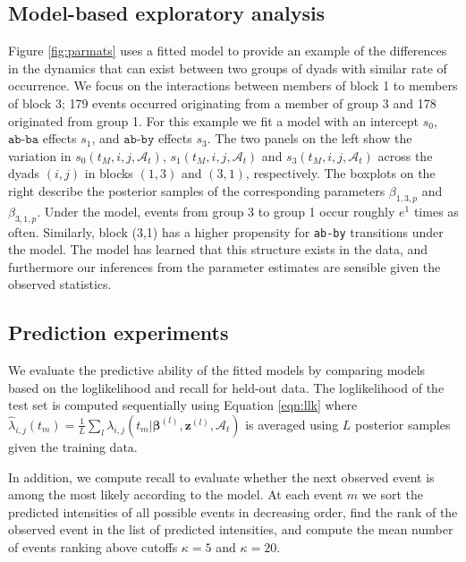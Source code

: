\subsection{Model-based exploratory analysis}

Figure \ref{fig:parmats} uses a fitted model to provide an example of the differences in the dynamics that can exist between two groups of dyads with similar rate of occurrence.
We focus on the interactions between members of block 1 to members of block 3; 179 events occurred originating from a member of group 3 and 178 originated from group 1.
For this example we fit a model with an intercept $s_0$, $\texttt{ab-ba}$ effects $s_1$, and $\texttt{ab-by}$ effects $s_3$.
The two panels on the left show the variation in $s_0(t_M,i,j,\mathcal{A}_t)$, $s_1(t_M,i,j,\mathcal{A}_t)$ and $s_3(t_M,i,j,\mathcal{A}_t)$ across the dyads $(i,j)$ in blocks $(1,3)$ and $(3,1)$, respectively.
The boxplots on the right describe the posterior samples of the corresponding parameters $\beta_{1,3,p}$ and $\beta_{3,1,p}$.
Under the model, events from group 3 to group 1 occur roughly $e^1$ times as often.
Similarly, block (3,1) has a higher propensity for \texttt{ab-by} transitions under the model.
The model has learned that this structure exists in the data, and furthermore our inferences from the parameter estimates are sensible given the observed statistics.

\subsection{Prediction experiments}

We evaluate the predictive ability of the fitted models by comparing models based on the loglikelihood and recall for held-out data.
The loglikelihood of the test set is computed sequentially using Equation \ref{eqn:llk} where $\hat{\lambda}_{i,j}(t_m) = \frac{1}{L}\sum_l \lambda_{i,j}(t_m | \boldsymbol{\beta}^{(l)}, \mathbf{z}^{(l)},\mathcal{A}_t)$ is averaged using $L$ posterior samples given the training data.

In addition, we compute recall to evaluate whether the next observed event is among the most likely according to the model.
At each event $m$ we sort the predicted intensities of all possible events in decreasing order, find the rank of the observed event in the list of predicted intensities, and compute the mean number of events ranking above cutoffs $\kappa=5$ and $\kappa=20$. 

